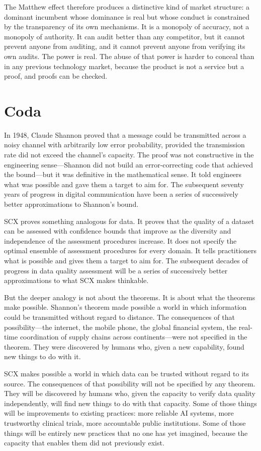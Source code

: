 \documentclass[12pt,a4paper]{article}
\begin{document}
The Matthew effect therefore produces a distinctive kind of market structure: a dominant incumbent whose dominance is real but whose conduct is constrained by the transparency of its own mechanisms. It is a monopoly of accuracy, not a monopoly of authority. It can audit better than any competitor, but it cannot prevent anyone from auditing, and it cannot prevent anyone from verifying its own audits. The power is real. The abuse of that power is harder to conceal than in any previous technology market, because the product is not a service but a proof, and proofs can be checked.

\section{Coda}

In 1948, Claude Shannon proved that a message could be transmitted across a noisy channel with arbitrarily low error probability, provided the transmission rate did not exceed the channel's capacity. The proof was not constructive in the engineering sense---Shannon did not build an error-correcting code that achieved the bound---but it was definitive in the mathematical sense. It told engineers what was possible and gave them a target to aim for. The subsequent seventy years of progress in digital communication have been a series of successively better approximations to Shannon's bound.

SCX proves something analogous for data. It proves that the quality of a dataset can be assessed with confidence bounds that improve as the diversity and independence of the assessment procedures increase. It does not specify the optimal ensemble of assessment procedures for every domain. It tells practitioners what is possible and gives them a target to aim for. The subsequent decades of progress in data quality assessment will be a series of successively better approximations to what SCX makes thinkable.

But the deeper analogy is not about the theorems. It is about what the theorems make possible. Shannon's theorem made possible a world in which information could be transmitted without regard to distance. The consequences of that possibility---the internet, the mobile phone, the global financial system, the real-time coordination of supply chains across continents---were not specified in the theorem. They were discovered by humans who, given a new capability, found new things to do with it.

SCX makes possible a world in which data can be trusted without regard to its source. The consequences of that possibility will not be specified by any theorem. They will be discovered by humans who, given the capacity to verify data quality independently, will find new things to do with that capacity. Some of those things will be improvements to existing practices: more reliable AI systems, more trustworthy clinical trials, more accountable public institutions. Some of those things will be entirely new practices that no one has yet imagined, because the capacity that enables them did not previously exist.
\end{document}
